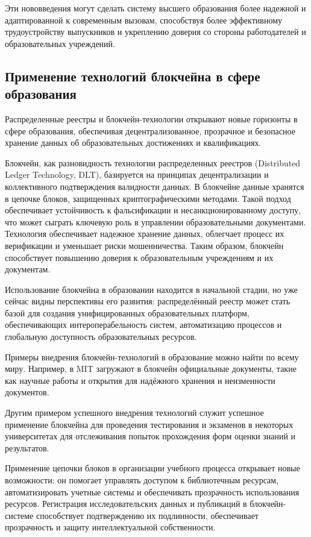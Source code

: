 Эти нововведения могут сделать систему высшего образования более надежной и адаптированной к современным вызовам, способствуя более эффективному трудоустройству выпускников и укреплению доверия со стороны работодателей и образовательных учреждений.

\subsection{Применение технологий блокчейна в сфере образования}

Распределенные реестры и блокчейн-технологии открывают новые горизонты в сфере образования, обеспечивая децентрализованное, прозрачное и безопасное хранение данных об образовательных достижениях и квалификациях.

Блокчейн, как разновидность технологии распределенных реестров (Distributed Ledger Technology, DLT), базируется на принципах децентрализации и коллективного подтверждения валидности данных. В блокчейне данные хранятся в цепочке блоков, защищенных криптографическими методами. Такой подход обеспечивает устойчивость к фальсификации и несанкционированному доступу, что может сыграть ключевую роль в управлении образовательными документами. Технология обеспечивает надежное хранение данных, облегчает процесс их верификации и уменьшает риски мошенничества. Таким образом, блокчейн способствует повышению доверия к образовательным учреждениям и их документам.

Использование блокчейна в образовании находится в начальной стадии, но уже сейчас видны перспективы его развития:  распределённый реестр может стать базой для создания унифицированных образовательных платформ, обеспечивающих интероперабельность систем, автоматизацию процессов и глобальную доступность образовательных ресурсов.

Примеры внедрения блокчейн-технологий в образование можно найти по всему миру. Например, в MIT загружают в блокчейн официальные документы, такие как научные работы и открытия для надёжного хранения и неизменности документов.

Другим примером успешного внедрения технологий служит успешное применение блокчейна для проведения тестирования и экзаменов в некоторых университетах для отслеживания попыток прохождения форм оценки знаний и результатов.

Применение цепочки блоков в организации учебного процесса открывает новые возможности: он помогает управлять доступом к библиотечным ресурсам, автоматизировать учетные системы и обеспечивать прозрачность использования ресурсов. Регистрация исследовательских данных и публикаций в блокчейн-системе способствует подтверждению их подлинности, обеспечивает прозрачность и защиту интеллектуальной собственности.

